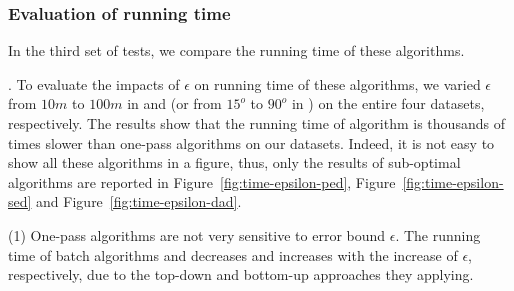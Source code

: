 


\vspace{-1ex}
\subsubsection{Evaluation of running time}

In the third set of tests, we compare the running time of these algorithms.


.
To evaluate the impacts of $\epsilon$ on running time of these algorithms, we varied $\epsilon$ from $10m$ to $100m$ in \ped and \sed (or from $15^o$ to $90^o$ in \dad) on the entire four datasets, respectively.
%
%
The results show that the running time of algorithm \opt is thousands of times slower than one-pass algorithms on our datasets.
Indeed, it is not easy to show all these algorithms in a figure, thus, only the results of sub-optimal algorithms are reported in Figure~\ref{fig:time-epsilon-ped}, Figure~\ref{fig:time-epsilon-sed} and Figure~\ref{fig:time-epsilon-dad}.

\sstab (1) One-pass algorithms are not very sensitive to error bound $\epsilon$. The running time of batch algorithms \dpa and \tpa decreases and increases with the increase of $\epsilon$, respectively, due to the top-down and bottom-up approaches they applying.


